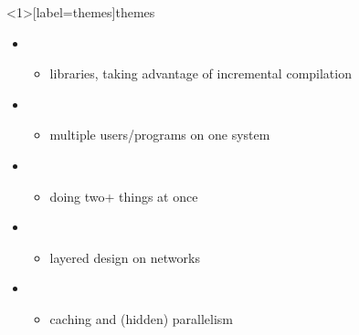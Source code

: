 \begin{frame}<1>[label=themes]{themes}
\begin{itemize}
    \item {}
        \begin{itemize}
        \item libraries, taking advantage of incremental compilation
        \end{itemize}
    \item {}
        \begin{itemize}
        \item multiple users/programs on one system
        \end{itemize}
    \item {}
        \begin{itemize}
        \item doing two+ things at once
        \end{itemize}
    \item {}
        \begin{itemize}
        \item layered design on networks
        \end{itemize}
    \item {}
        \begin{itemize}
        \item caching and (hidden) parallelism
        \end{itemize}
    \end{itemize}
\end{frame}
